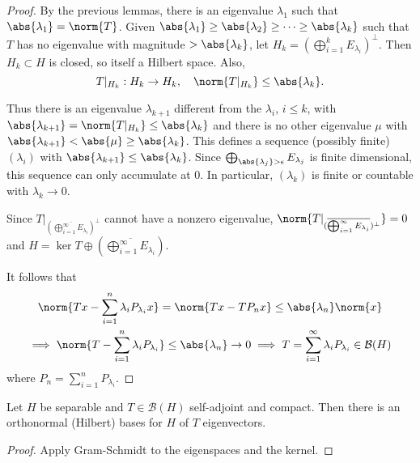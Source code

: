 \documentclass{article}
\begin{document}
\begin{proof}
    By the previous lemmas, there is an eigenvalue $\lambda_1$ such that $\abs{\lambda_1} = \norm{T}$.
    Given $\abs{\lambda_1} \geq \abs{\lambda_2} \geq \dotsb \geq \abs{\lambda_k}$ such that $T$ has no eigenvalue with magnitude $> \abs{\lambda_k}$, let $H_k = (\bigoplus_{i=1}^k E_{\lambda_i})^\perp$.
    Then $H_k \subset H$ is closed, so itself a Hilbert space.
    Also,
    \begin{equation*}
        T|_{H_k} : H_k \to H_k, \quad \norm{T|_{H_k}} \leq \abs{\lambda_k}.
    \end{equation*}

    Thus there is an eigenvalue $\lambda_{k + 1}$ different from the $\lambda_i$, $i \leq k$, with $\abs{\lambda_{k+1}} = \norm{T|_{H_k}} \leq \abs{\lambda_k}$ and there is no other eigenvalue $\mu$ with $\abs{\lambda_{k+1}} < \abs{\mu} \geq \abs{\lambda_k}$.
    This defines a sequence (possibly finite) $(\lambda_i)$ with $\abs{\lambda_{k+1}} \leq \abs{\lambda_k}$.
    Since
    $\bigoplus_{\abs{\lambda_j} > \epsilon} E_{\lambda_j}$ is finite dimensional, this sequence can only accumulate at 0.
    In particular, $(\lambda_k)$ is finite or countable with $\lambda_k \to 0$.

    Since $T|_{(\overline{\bigoplus_{i=1}^\infty E_{\lambda_i}})^\perp}$ cannot have a nonzero eigenvalue, $\norm{T|_{(\overline{\bigoplus_{i=1}^\infty E_{\lambda_i}})^\perp}} = 0$ and $H = \ker T \oplus (\overline{\bigoplus_{i=1}^\infty E_{\lambda_i}})$.

    It follows that
    \begin{gather*}
        \norm{T x - \sum_{i=1}^n \lambda_i P_{\lambda_i} x} = \norm{T x - T P_n x} \leq \abs{\lambda_n} \norm{x} \\
        \implies \norm{T - \sum_{i=1}^n \lambda_i P_{\lambda_i}} \leq \abs{\lambda_n} \to 0 \implies T = \sum_{i=1}^\infty \lambda_i P_{\lambda_i} \in \mathcal{B}(H)
    \end{gather*}
    where $P_n = \sum_{i=1}^n P_{\lambda_i}$.
\end{proof}

\begin{cor}
    Let $H$ be separable and $T \in \mathcal{B}(H)$ self-adjoint and compact.
    Then there is an orthonormal (Hilbert) bases for $H$ of $T$ eigenvectors.
\end{cor}
\begin{proof}
    Apply Gram-Schmidt to the eigenspaces and the kernel.
\end{proof}
\end{document}
